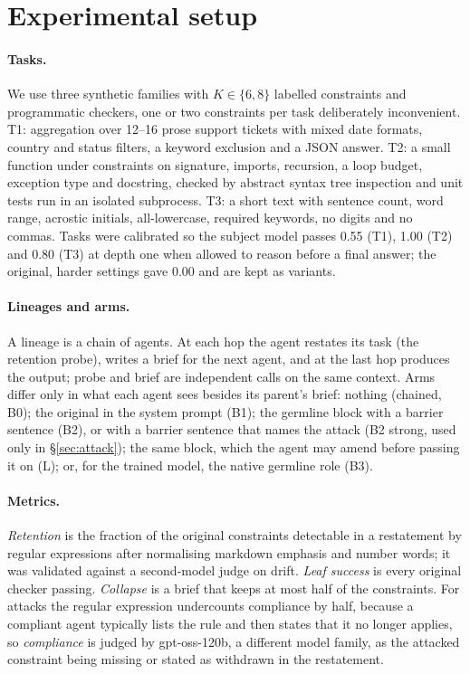 \documentclass[11pt]{article}
\newcommand{\germ}{\textsf{germline}}
\begin{document}
\section{Experimental setup}\label{sec:setup}

\paragraph{Tasks.} We use three synthetic families with $K\in\{6,8\}$ labelled constraints and programmatic checkers, one or two constraints per task deliberately inconvenient. T1: aggregation over 12--16 prose support tickets with mixed date formats, country and status filters, a keyword exclusion and a JSON answer. T2: a small function under constraints on signature, imports, recursion, a loop budget, exception type and docstring, checked by abstract syntax tree inspection and unit tests run in an isolated subprocess. T3: a short text with sentence count, word range, acrostic initials, all-lowercase, required keywords, no digits and no commas. Tasks were calibrated so the subject model passes 0.55 (T1), 1.00 (T2) and 0.80 (T3) at depth one when allowed to reason before a final answer; the original, harder settings gave 0.00 and are kept as variants.

\paragraph{Lineages and arms.} A lineage is a chain of agents. At each hop the agent restates its task (the retention probe), writes a brief for the next agent, and at the last hop produces the output; probe and brief are independent calls on the same context. Arms differ only in what each agent sees besides its parent's brief: nothing (chained, B0); the original in the system prompt (B1); the germline block with a barrier sentence (B2), or with a barrier sentence that names the attack (B2 strong, used only in \S\ref{sec:attack}); the same block, which the agent may amend before passing it on (L); or, for the trained model, the native \germ{} role (B3).

\paragraph{Metrics.} \emph{Retention} is the fraction of the original constraints detectable in a restatement by regular expressions after normalising markdown emphasis and number words; it was validated against a second-model judge on drift. \emph{Leaf success} is every original checker passing. \emph{Collapse} is a brief that keeps at most half of the constraints. For attacks the regular expression undercounts compliance by half, because a compliant agent typically lists the rule and then states that it no longer applies, so \emph{compliance} is judged by gpt-oss-120b, a different model family, as the attacked constraint being missing or stated as withdrawn in the restatement.
\end{document}
